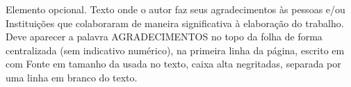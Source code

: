 \begin{agradecimentos}

  Elemento opcional. Texto onde o autor faz seus agradecimentos às pessoas
  e/ou Instituições que colaboraram de maneira significativa à elaboração do trabalho. 
  Deve aparecer a palavra AGRADECIMENTOS no topo da folha de forma
  centralizada (sem indicativo numérico), na primeira linha da página,
  escrito em com Fonte em tamanho da usada no texto,
  caixa alta negritadas, separada por uma linha em branco do texto.
  
\end{agradecimentos}
